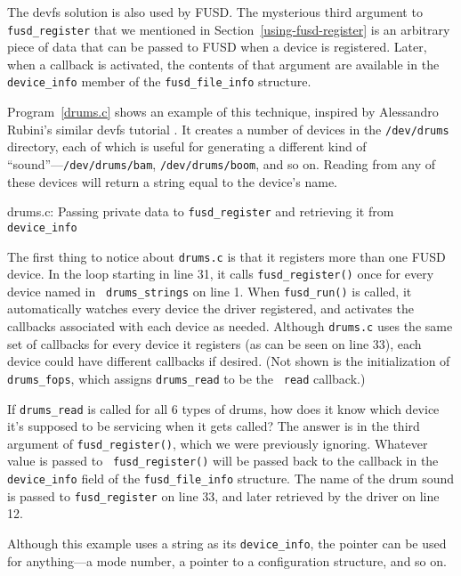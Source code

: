 \documentclass{article}
\begin{document}
The devfs solution is also used by FUSD.  The mysterious third
argument to {\tt fusd\_register} that we mentioned in
Section~\ref{using-fusd-register} is an arbitrary piece of data that
can be passed to FUSD when a device is registered.  Later, when a
callback is activated, the contents of that argument are available in
the {\tt device\_info} member of the {\tt fusd\_file\_info} structure.

Program~\ref{drums.c} shows an example of this technique, inspired by 
Alessandro Rubini's similar devfs tutorial
.  It creates a number
of devices in the {\tt /dev/drums} directory, each of which is useful
for generating a different kind of ``sound''---{\tt /dev/drums/bam},
{\tt /dev/drums/boom}, and so on.  Reading from any of these devices
will return a string equal to the device's name.

\begin{Program}
\caption{drums.c: Passing private data to {\tt fusd\_register} and
retrieving it from {\tt device\_info}}
\label{drums.c}
\end{Program}

The first thing to notice about {\tt drums.c} is that it registers
more than one FUSD device.  In the loop starting in line 31, it calls
{\tt fusd\_register()} once for every device named in {\tt
drums\_strings} on line 1.  When {\tt fusd\_run()} is called, it
automatically watches every device the driver registered, and
activates the callbacks associated with each device as needed.
Although {\tt drums.c} uses the same set of callbacks for every device
it registers (as can be seen on line 33), each device could have
different callbacks if desired.  (Not shown is the initialization of
{\tt drums\_fops}, which assigns {\tt drums\_read} to be the {\tt
read} callback.)

If {\tt drums\_read} is called for all 6 types of drums, how does it
know which device it's supposed to be servicing when it gets called?
The answer is in the third argument of {\tt fusd\_register()}, which
we were previously ignoring.  Whatever value is passed to {\tt
fusd\_register()} will be passed back to the callback in the {\tt
device\_info} field of the {\tt fusd\_file\_info} structure.  The name
of the drum sound is passed to {\tt fusd\_register} on line 33, and
later retrieved by the driver on line 12.

Although this example uses a string as its {\tt device\_info}, the
pointer can be used for anything---a mode number, a pointer to a
configuration structure, and so on.
\end{document}
